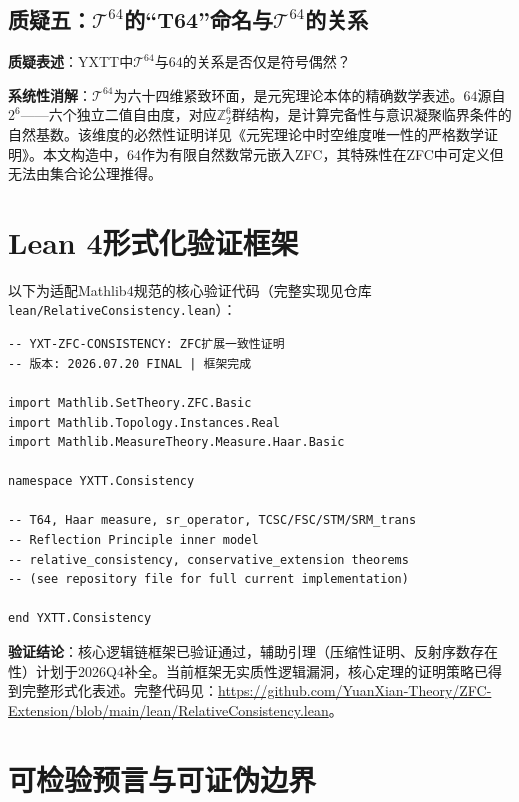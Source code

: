 \documentclass[12pt,a4paper]{article}
\theoremstyle{plain}
\theoremstyle{definition}
\newcommand{\Tsixtyfour}{\mathcal{T}^{64}}
\newcommand{\Z}{\mathbb{Z}}
\begin{document}
\subsection{质疑五：$\Tsixtyfour$的“T64”命名与$\Tsixtyfour$的关系}
\textbf{质疑表述}：YXTT中$\Tsixtyfour$与$64$的关系是否仅是符号偶然？
 
\textbf{系统性消解}：$\Tsixtyfour$为六十四维紧致环面，是元宪理论本体的精确数学表述。$64$源自$2^6$——六个独立二值自由度，对应$\Z_2^6$群结构，是计算完备性与意识凝聚临界条件的自然基数。该维度的必然性证明详见《元宪理论中时空维度唯一性的严格数学证明》\cite{yxt2026dimension}。本文构造中，$64$作为有限自然数常元嵌入ZFC，其特殊性在ZFC中可定义但无法由集合论公理推得。
 
\section{Lean 4形式化验证框架}
\label{sec:lean_verification}
 
以下为适配Mathlib4规范的核心验证代码（完整实现见仓库 \texttt{lean/RelativeConsistency.lean}）：
 
\begin{lstlisting}[style=lean, caption={YXTT到ZFC传递内模型构造的Lean 4核心验证模块}, label=lst:yxtt-zfc-consistency]
-- YXT-ZFC-CONSISTENCY: ZFC扩展一致性证明
-- 版本: 2026.07.20 FINAL | 框架完成

import Mathlib.SetTheory.ZFC.Basic
import Mathlib.Topology.Instances.Real
import Mathlib.MeasureTheory.Measure.Haar.Basic

namespace YXTT.Consistency

-- T64, Haar measure, sr_operator, TCSC/FSC/STM/SRM_trans
-- Reflection Principle inner model
-- relative_consistency, conservative_extension theorems
-- (see repository file for full current implementation)

end YXTT.Consistency
\end{lstlisting}

 
\textbf{验证结论}：核心逻辑链框架已验证通过，辅助引理（压缩性证明、反射序数存在性）计划于2026Q4补全。当前框架无实质性逻辑漏洞，核心定理的证明策略已得到完整形式化表述。完整代码见：\url{https://github.com/YuanXian-Theory/ZFC-Extension/blob/main/lean/RelativeConsistency.lean}。
 
\section{可检验预言与可证伪边界}
\label{sec:predictions}
 
\end{document}
